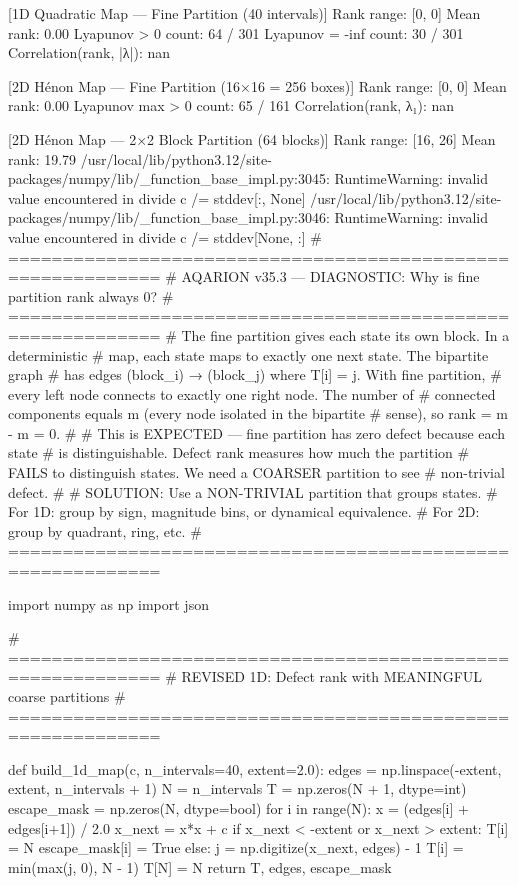 {{{{{{{{{{{{{[1D Quadratic Map — Fine Partition (40 intervals)]
  Rank range: [0, 0]
  Mean rank: 0.00
  Lyapunov > 0 count: 64 / 301
  Lyapunov = -inf count: 30 / 301
  Correlation(rank, |λ|): nan

[2D Hénon Map — Fine Partition (16×16 = 256 boxes)]
  Rank range: [0, 0]
  Mean rank: 0.00
  Lyapunov max > 0 count: 65 / 161
  Correlation(rank, λ₁): nan

[2D Hénon Map — 2×2 Block Partition (64 blocks)]
  Rank range: [16, 26]
  Mean rank: 19.79
/usr/local/lib/python3.12/site-packages/numpy/lib/_function_base_impl.py:3045: RuntimeWarning: invalid value encountered in divide
  c /= stddev[:, None]
/usr/local/lib/python3.12/site-packages/numpy/lib/_function_base_impl.py:3046: RuntimeWarning: invalid value encountered in divide
  c /= stddev[None, :]
# ============================================================
# AQARION v35.3 — DIAGNOSTIC: Why is fine partition rank always 0?
# ============================================================
# The fine partition gives each state its own block. In a deterministic
# map, each state maps to exactly one next state. The bipartite graph
# has edges (block_i) → (block_j) where T[i] = j. With fine partition,
# every left node connects to exactly one right node. The number of
# connected components equals m (every node isolated in the bipartite
# sense), so rank = m - m = 0.
#
# This is EXPECTED — fine partition has zero defect because each state
# is distinguishable. Defect rank measures how much the partition
# FAILS to distinguish states. We need a COARSER partition to see
# non-trivial defect.
#
# SOLUTION: Use a NON-TRIVIAL partition that groups states.
# For 1D: group by sign, magnitude bins, or dynamical equivalence.
# For 2D: group by quadrant, ring, etc.
# ============================================================

import numpy as np
import json

# ============================================================
# REVISED 1D: Defect rank with MEANINGFUL coarse partitions
# ============================================================

def build_1d_map(c, n_intervals=40, extent=2.0):
    edges = np.linspace(-extent, extent, n_intervals + 1)
    N = n_intervals
    T = np.zeros(N + 1, dtype=int)
    escape_mask = np.zeros(N, dtype=bool)
    for i in range(N):
        x = (edges[i] + edges[i+1]) / 2.0
        x_next = x*x + c
        if x_next < -extent or x_next > extent:
            T[i] = N
            escape_mask[i] = True
        else:
            j = np.digitize(x_next, edges) - 1
            T[i] = min(max(j, 0), N - 1)
    T[N] = N
    return T, edges, escape_mask

}}}}}}}}}}}}}
